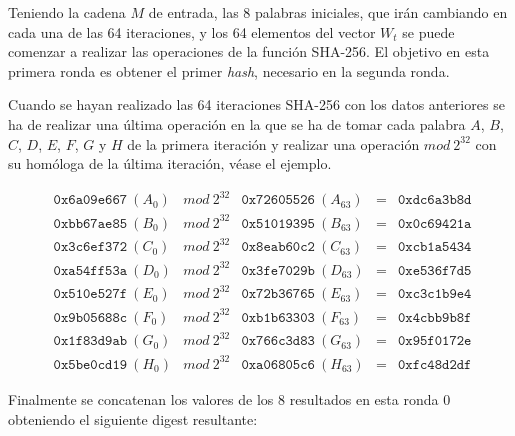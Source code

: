 \documentclass{article}
\begin{document}
    \vspace{1mm}
    
    Teniendo la cadena $M$ de entrada, las 8 palabras iniciales, que irán cambiando en cada una de las 64 iteraciones, y los 64 elementos del vector $W_t$ se puede comenzar a realizar las operaciones de la función SHA-256. El objetivo en esta primera ronda es obtener el primer \textit{hash}, necesario en la segunda ronda.
    
    \vspace{3mm}
    
    Cuando se hayan realizado las 64 iteraciones SHA-256 con los datos anteriores se ha de realizar una última operación en la que se ha de tomar cada palabra $A$, $B$, $C$, $D$, $E$, $F$, $G$ y $H$ de la primera iteración y realizar  una operación $mod\ 2^{32}$ con su homóloga de la última iteración, véase el ejemplo.
    
    \begin{figure}[H]
    \centering
        $\begin{array}{lllll}
            \texttt{0x6a09e667}\ (A_{0}) & mod\ 2^{32} & \texttt{0x72605526}\ (A_{63}) & = & \texttt{0xdc6a3b8d} \\
            \texttt{0xbb67ae85}\ (B_{0}) & mod\ 2^{32} & \texttt{0x51019395}\ (B_{63}) & = & \texttt{0x0c69421a} \\
            \texttt{0x3c6ef372}\ (C_{0}) & mod\ 2^{32} & \texttt{0x8eab60c2}\ (C_{63}) & = & \texttt{0xcb1a5434} \\
            \texttt{0xa54ff53a}\ (D_{0}) & mod\ 2^{32} & \texttt{0x3fe7029b}\ (D_{63}) & = & \texttt{0xe536f7d5} \\
            \texttt{0x510e527f}\ (E_{0}) & mod\ 2^{32} & \texttt{0x72b36765}\ (E_{63}) & = & \texttt{0xc3c1b9e4} \\
            \texttt{0x9b05688c}\ (F_{0}) & mod\ 2^{32} & \texttt{0xb1b63303}\ (F_{63}) & = & \texttt{0x4cbb9b8f} \\
            \texttt{0x1f83d9ab}\ (G_{0}) & mod\ 2^{32} & \texttt{0x766c3d83}\ (G_{63}) & = & \texttt{0x95f0172e} \\
            \texttt{0x5be0cd19}\ (H_{0}) & mod\ 2^{32} & \texttt{0xa06805c6}\ (H_{63}) & = & \texttt{0xfc48d2df}
        \end{array}$
    \end{figure}
    
    Finalmente se concatenan los valores de los 8 resultados en esta ronda 0 obteniendo el siguiente digest resultante:
    
\end{document}
